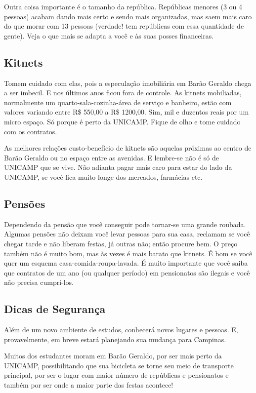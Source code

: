 \documentclass[a4paper,10pt, twocolumn]{article}
\begin{document}
Outra coisa importante é o tamanho da república. Repúblicas menores (3 ou
4 pessoas) acabam dando mais certo e sendo mais organizadas, mas saem mais caro
do que morar com 13 pessoas (verdade! tem repúblicas com essa quantidade de
gente). Veja o que mais se adapta a você e às suas posses financeiras.

\subsection{Kitnets}
Tomem cuidado com elas, pois a especulação imobiliária em Barão Geraldo chega
a ser imbecil. E nos últimos anos ficou fora de controle. As kitnets mobiliadas,
normalmente um quarto-sala-cozinha-área de serviço e banheiro, estão com valores
variando entre R\$ 550,00 a R\$ 1200,00. Sim, mil e duzentos reais por um micro
espaço. Só porque é perto da UNICAMP. Fique de olho e tome cuidado com os
contratos.

As melhores relações custo-benefício de kitnets são aquelas próximas ao centro
de Barão Geraldo ou no espaço entre as avenidas. E lembre-se não é só de UNICAMP
que se vive. Não adianta pagar mais caro para estar do lado da UNICAMP, se você
fica muito longe dos mercados, farmácias etc.

\subsection{Pensões}
Dependendo da pensão que você conseguir pode tornar-se uma grande roubada.
Algumas pensões não deixam você levar pessoas para sua casa, reclamam se você
chegar tarde e não liberam festas, já outras não; então procure bem. O preço
também não é muito bom, mas às vezes é mais barato que kitnets. É bom se você
quer um esquema casa-comida-roupa-lavada. É muito importante que você saiba que
contratos de um ano (ou qualquer período) em pensionatos são ilegais e você não
precisa cumpri-los.

\subsection{Dicas de Segurança}
Além de um novo ambiente de estudos, conhecerá novos lugares e pessoas. E,
provavelmente, em breve estará planejando sua mudança para Campinas.

Muitos dos estudantes moram em Barão Geraldo, por ser mais perto da UNICAMP,
possibilitando que sua bicicleta se torne seu meio de transporte principal, por
ser o lugar com maior número de repúblicas e pensionatos e também por ser onde
a maior parte das festas acontece!
\end{document}
